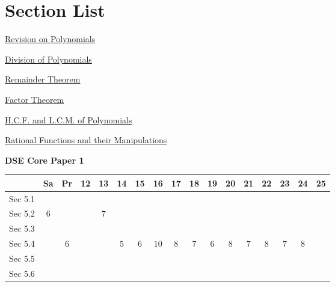 \documentclass[12pt, a4paper]{article}
\begin{document}
\section*{Section List}
\begin{enumx}[label=Sec 5.\arabic*\ ]
\item \hyperref[section:4-5-1]{Revision on Polynomials }
\item \hyperref[section:4-5-2]{Division of Polynomials}
\item \hyperref[section:4-5-3]{Remainder Theorem}
\item \hyperref[section:4-5-4]{Factor Theorem}
\item \hyperref[section:4-5-5]{H.C.F. and L.C.M. of Polynomials \NF}
\item \hyperref[section:4-5-6]{Rational Functions and their Manipulations \NF}
\end{enumx}
\begin{absolutelynopagebreak}
\begin{center}
\textbf{DSE Core Paper 1}
\end{center}
\begin{center}
\begin{tabular}{|l|c|c|c|c|c|c|c|c|c|c|c|c|c|c|c|c|}
\hline
        & Sa & Pr & 12 & 13 & 14 & 15 & 16 & 17 & 18 & 19 & 20 & 21 & 22 & 23 & 24 & 25 \\\hline\hline
Sec 5.1 &  &  &  &  &  &  &  &  &  &  &  &  &  &  &  &  \\\hline
Sec 5.2 &  $6$ &  &  &  $7$ &  &  &  &  &  &  &  &  &  &  &  &  \\\hline
Sec 5.3 &  &  &  &  &  &  &  &  &  &  &  &  &  &  &  &  \\\hline
Sec 5.4 &  &  $6$ &  &  &  $5$ &  $6$ &  $10$ &  $8$ &  $7$ &  $6$ &  $8$ &  $7$ &  $8$ &  $7$ &  $8$ &  \\\hline
Sec 5.5 &  &  &  &  &  &  &  &  &  &  &  &  &  &  &  &  \\\hline
Sec 5.6 &  &  &  &  &  &  &  &  &  &  &  &  &  &  &  &  \\\hline
\end{tabular}
\end{center}
\end{absolutelynopagebreak}
\end{document}
